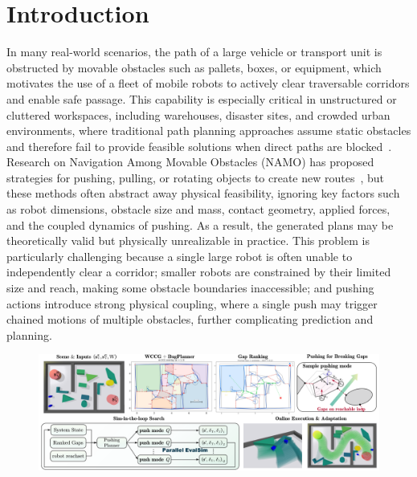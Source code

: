 \section{Introduction}\label{sec:intro}
In many real-world scenarios, the path of a large vehicle or transport unit is obstructed by
movable obstacles such as pallets, boxes, or equipment, which motivates the use of a fleet of
mobile robots to actively clear traversable corridors and enable safe passage. This capability
is especially critical in unstructured or cluttered workspaces, including warehouses, disaster
sites, and crowded urban environments, where traditional path planning approaches assume
static obstacles and therefore fail to provide feasible solutions when direct paths are
blocked~\cite{}. Research on Navigation Among Movable Obstacles (NAMO) has proposed strategies
for pushing, pulling, or rotating objects to create new routes~\cite{}, but these methods often
abstract away physical feasibility, ignoring key factors such as robot dimensions, obstacle
size and mass, contact geometry, applied forces, and the coupled dynamics of pushing. As a
result, the generated plans may be theoretically valid but physically unrealizable in practice.
This problem is particularly challenging because a single large robot is often unable to
independently clear a corridor; smaller robots are constrained by their limited size and reach,
making some obstacle boundaries inaccessible; and pushing actions introduce strong physical
coupling, where a single push may trigger chained motions of multiple obstacles, further
complicating prediction and planning.

\begin{figure}[t!]
  \centering
  \includegraphics[width=0.95\hsize]{figures/overall.png}
  \vspace{-0.1in}
  \caption{}
  \label{fig:overall}
  \vspace{-0.2in}
\end{figure}


